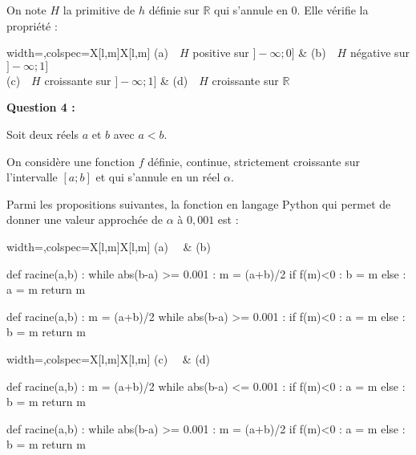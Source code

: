 On note $H$ la primitive de $h$ définie sur $\mathbb{R}$ qui s'annule en 0. Elle vérifie la propriété :

\medskip

\begin{tblr}{width=\linewidth,colspec={X[l,m]X[l,m]}}
	(a)~~$H$ positive sur $]-\infty;0]$ & (b)~~$H$ négative sur $]-\infty;1]$ \\ (c)~~$H$ croissante sur $]-\infty;1]$ & (d)~~$H$ croissante sur $\mathbb{R}$
\end{tblr}

\bigskip

\textbf{Question 4 :}

\medskip

Soit deux réels $a$ et $b$ avec $a < b$.

On considère une fonction $f$ définie, continue, strictement croissante sur l'intervalle $[a;b]$ et qui s'annule en un réel $\alpha$.

Parmi les propositions suivantes, la fonction en langage \textsf{Python} qui permet de donner une valeur approchée de $\alpha$ à $0,001$ est :

\medskip

\begin{tblr}{width=\linewidth,colspec={X[l,m]X[l,m]}}
	(a)~~ & (b)~~
\end{tblr}

\begin{minipage}{0.5\linewidth}
\begin{CodePythonLstAlt}[Largeur=8cm]{}
def racine(a,b) :
	while abs(b-a) >= 0.001 :
		m = (a+b)/2
		if f(m)<0 :
			b = m
		else :
			a = m
	return m
\end{CodePythonLstAlt}
\end{minipage}
\begin{minipage}{0.5\linewidth}
\begin{CodePythonLstAlt}[Largeur=8cm]{}
def racine(a,b) :
	m = (a+b)/2
	while abs(b-a) >= 0.001 :
		if f(m)<0 :
			a = m
		else :
			b = m
	return m
\end{CodePythonLstAlt}
\end{minipage}

\begin{tblr}{width=\linewidth,colspec={X[l,m]X[l,m]}}
	(c)~~ & (d)~~
\end{tblr}

\begin{minipage}{0.5\linewidth}
\begin{CodePythonLstAlt}[Largeur=8cm]{}
def racine(a,b) :
	m = (a+b)/2
	while abs(b-a) <= 0.001 :
		if f(m)<0 :
			a = m
		else :
			b = m
	return m
\end{CodePythonLstAlt}
\end{minipage}
\begin{minipage}{0.5\linewidth}
\begin{CodePythonLstAlt}[Largeur=8cm]{}
def racine(a,b) :
	while abs(b-a) >= 0.001 :
		m = (a+b)/2
		if f(m)<0 :
			a = m
		else :
			b = m
	return m
\end{CodePythonLstAlt}
\end{minipage}

